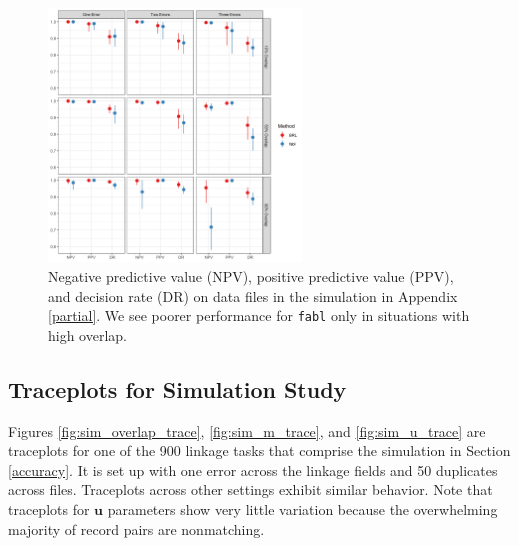 \documentclass[ba]{imsart}
\begin{document}

\begin{figure}[t]
	\begin{center}
		\includegraphics[width=0.6\textwidth]{../notes/figures/sadinle_sim_plot_partial_DR} 
		\caption{Negative predictive value (NPV), positive predictive value (PPV), and decision rate (DR) on data files in the simulation in Appendix \ref{partial}. We see poorer performance for \texttt{fabl} only in situations with high overlap.}
		\label{fig:sadinle_simulation_partial}
	\end{center}
\end{figure}
	
	
	\hypertarget{appendix-sim}{%
		\subsection{Traceplots for Simulation Study}\label{app:appendix-sim}}
	Figures \ref{fig:sim_overlap_trace}, \ref{fig:sim_m_trace}, and \ref{fig:sim_u_trace} are traceplots for one of the 900 linkage tasks that comprise the simulation in Section \ref{accuracy}. It is set up with one error across the linkage fields and 50 duplicates across files. Traceplots across other settings exhibit similar behavior. Note that traceplots for $\bm{u}$ parameters show very little variation because the overwhelming majority of record pairs are nonmatching.  
	
\end{document}
